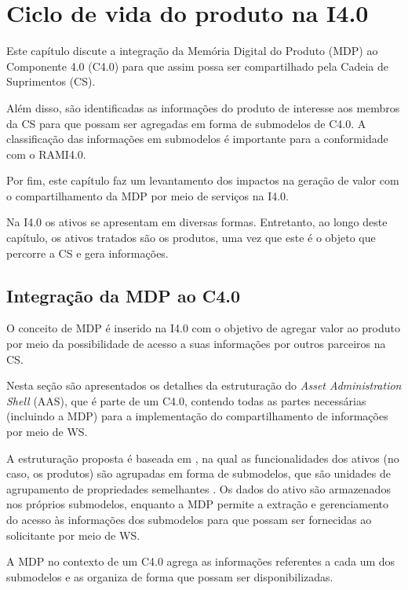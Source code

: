 \chapter{Ciclo de vida do produto na I4.0}
\label{cha:ciclo-de-vida}

Este capítulo discute a integração da Memória Digital do Produto (MDP) ao Componente 4.0 (C4.0) para que assim possa ser compartilhado pela Cadeia de Suprimentos (CS).

Além disso, são identificadas as informações do produto de interesse aos membros da CS para que possam ser agregadas em forma de submodelos de C4.0. A classificação das informações em submodelos é importante para a conformidade com o RAMI4.0.

Por fim, este capítulo faz um levantamento dos impactos na geração de valor com o compartilhamento da MDP por meio de serviços na I4.0.

Na I4.0 os ativos se apresentam em diversas formas. Entretanto, ao longo deste capítulo, os ativos tratados são os produtos, uma vez que este é o objeto que percorre a CS e gera informações.

\section{Integração da MDP ao C4.0}
\label{sec:estrutura-aas}

O conceito de MDP é inserido na I4.0 com o objetivo de agregar valor ao produto por meio da possibilidade de acesso a suas informações por outros parceiros na CS.

Nesta seção são apresentados os detalhes da estruturação do \textit{Asset Administration Shell} (AAS), que é parte de um C4.0, contendo todas as partes necessárias (incluindo a MDP) para a implementação do compartilhamento de informações por meio de WS.

A estruturação proposta é baseada em , na qual as funcionalidades dos ativos (no caso, os produtos) são agrupadas em forma de submodelos, que são unidades de agrupamento de propriedades semelhantes \cite{bader2019aas, adolph2018roadmap, bedenbender2017aasexamples}. Os dados do ativo são armazenados nos próprios submodelos, enquanto a MDP permite a extração e gerenciamento do acesso às informações dos submodelos para que possam ser fornecidas ao solicitante por meio de WS.

A MDP no contexto de um C4.0 agrega as informações referentes a cada um dos submodelos e as organiza de forma que possam ser disponibilizadas.

